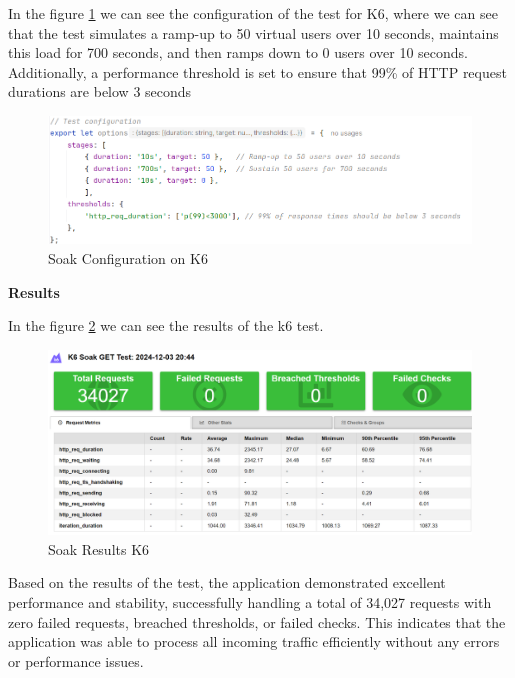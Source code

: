 \documentclass[a4paper,11pt,openright,BCOR=15mm]{scrbook}
\begin{document}
In the figure \ref{fig:SoakConfigurationK6} we can see the configuration of the test for K6, where we can see that the test simulates a ramp-up to 50 virtual users over 10 seconds, maintains this load for 700 seconds, and then ramps down to 0 users over 10 seconds. Additionally, a performance threshold is set to ensure that 99\% of HTTP request durations are below 3 seconds


\begin{figure}[H]
	\centering
	\includegraphics[width=\textwidth]{figs/Performance/k6/SoakGetK6.png}
	\caption{Soak Configuration on K6}
	\label{fig:SoakConfigurationK6}
\end{figure}






\textbf{Results}

In the figure \ref{fig:SoakResultsK6} we can see the results of the k6 test.

\begin{figure}[H]
	\centering
	\includegraphics[width=\textwidth]{figs/Performance/k6/SoakGetK6Result.png}
	\caption{Soak Results K6}
	\label{fig:SoakResultsK6}
\end{figure}

Based on the results of the test, the application demonstrated excellent performance and stability, successfully handling a total of 34,027 requests with zero failed requests, breached thresholds, or failed checks. This indicates that the application was able to process all incoming traffic efficiently without any errors or performance issues.
\end{document}
